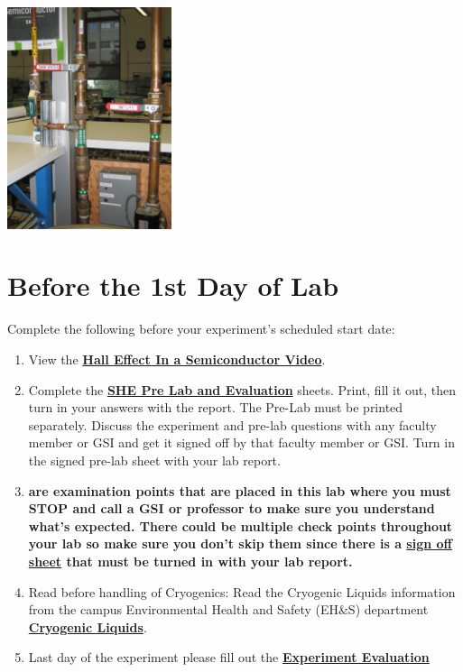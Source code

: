\documentclass{../lab}
\newcommand{\SHEVideo}{http://youtu.be/7JYq1rRl6Xk}
\newcommand{\SHEPreLab}{http://experimentationlab.berkeley.edu/SHEPreLab}
\newcommand{\SignOffSheet}{http://experimentationlab.berkeley.edu/shecheckpoints}
\newcommand{\CryogenicLiquids}{http://experimentationlab.berkeley.edu/sites/default/files/images/77cryogenic.pdf}
\begin{document}
\href{http://experimentationlab.berkeley.edu/sites/default/files/images/SHE_Water_Crop_3544.jpg}{\includegraphics[width=0.33\linewidth,height=6.5cm,keepaspectratio]{images/SHE_Water_Crop_3544.jpg}}

\section{Before the 1st Day of Lab}

Complete the following before your experiment's scheduled start date:

\begin{enumerate}
    \item View the \href{\SHEVideo}{\textbf{Hall Effect In a Semiconductor Video}}.

    \item Complete the \href{\SHEPreLab}{\textbf{SHE Pre Lab and Evaluation}} sheets. Print, fill it out, then turn in your answers with the report. The Pre-Lab must be printed separately. Discuss the experiment and pre-lab questions with any faculty member or GSI and get it signed off by that faculty member or GSI. Turn in the signed pre-lab sheet with your lab report.

    \item \textbf{\underline{} are examination points that are placed in this lab where you must STOP and call a GSI or professor to make sure you understand what's expected. There could  be multiple check points throughout your lab so make sure you don't skip them since there is a \href{\SignOffSheet}{sign off sheet} that must be turned in with your lab report.}

    \item Read before handling of Cryogenics: Read the Cryogenic Liquids information from the campus Environmental Health and Safety (EH\&S) department \href{\CryogenicLiquids}{\textbf{Cryogenic Liquids}}.

    \item Last day of the experiment please fill out the \href{\ExperimentEvaluation}{\textbf{Experiment Evaluation}}
\end{enumerate}
\end{document}
